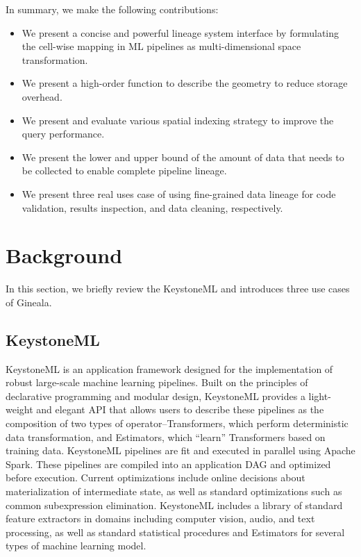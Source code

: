 \documentclass{sig-alternate}
\newenvironment{shortlist}{
        \vspace*{-0.5em}
  \begin{itemize}
  \setlength{\itemsep}{-0.1em}
}{
  \end{itemize}
        \vspace*{-0.5em}
}
\begin{document}
In summary, we make the following contributions:
\begin{shortlist}
\item{} We present a concise and powerful lineage system interface by formulating the cell-wise mapping in ML pipelines as multi-dimensional space transformation.
\item{} We present a high-order function to describe the geometry to reduce storage overhead.
\item{} We present and evaluate various spatial indexing strategy to improve the query performance.
\item{} We present the lower and upper bound of the amount of data that needs to be collected to enable complete pipeline lineage.
\item{} We present three real uses case of using fine-grained data lineage for code validation, results inspection, and data cleaning, respectively.
\end{shortlist}


\section{Background}
\label{sec:Background}
In this section, we briefly review the KeystoneML and introduces three use cases of Gineala.

\subsection{KeystoneML}
KeystoneML is an application framework designed for the implementation of robust large-scale machine learning pipelines. Built on the principles of declarative programming and modular design, KeystoneML provides a light-weight and elegant API that allows users to describe these pipelines as the composition of two types of operator--Transformers, which perform deterministic data transformation, and Estimators, which ``learn'' Transformers based on training data. KeystoneML pipelines are fit and executed in parallel using Apache Spark. These pipelines are compiled into an application DAG and optimized before execution. Current optimizations include online decisions about materialization of intermediate state, as well as standard optimizations such as common subexpression elimination. KeystoneML includes a library of standard feature extractors in domains including computer vision, audio, and text processing, as well as standard statistical procedures and Estimators for several types of machine learning model.
\end{document}
